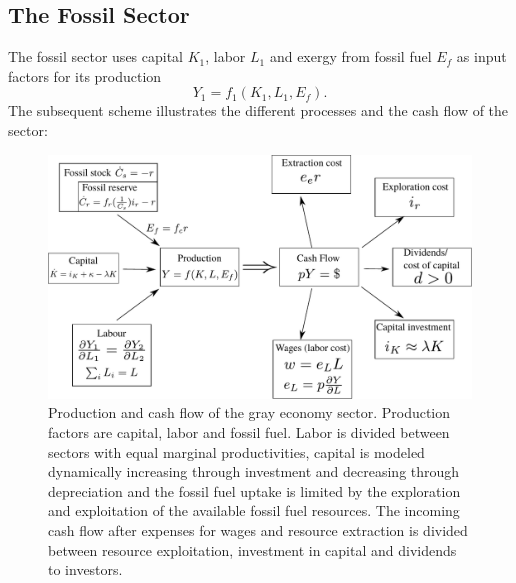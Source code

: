 \subsection{The Fossil Sector}
The fossil sector uses capital $K_1$, labor $L_1$ and exergy from fossil fuel $E_f$ as input factors for its production 
\begin{equation}
	Y_1 = f_1(K_1,L_1,E_f).
\end{equation}
The subsequent scheme illustrates the different processes and the cash flow of the sector:
\begin{figure}[H]
	\centering
	\includegraphics[width = \textwidth]{Sector_model_grey.pdf}
	\caption{Production and cash flow of the gray economy sector. Production factors are capital, labor and fossil fuel. Labor is divided between sectors with equal marginal productivities, capital is modeled dynamically increasing through investment and decreasing through depreciation and the fossil fuel uptake is limited by the exploration and exploitation of the available fossil fuel resources. The incoming cash flow after expenses for wages and resource extraction is divided between resource exploitation, investment in capital and dividends to investors.}
	\label{fig:sector_grey}
\end{figure}

